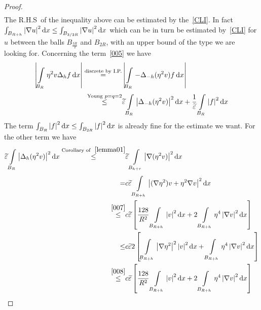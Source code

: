 \begin{proof}
\begin{gather}
	\end{gather}
	The R.H.S\ of the inequality above can be estimated by the~\eqref{CLI}. In fact \( \int_{B_{R+h}}^{} \abs{\nabla u}^{2} \dd{x} \leq \int_{B_{\frac{3}{2}R}}^{} \abs{\nabla u}^{2} \dd{x} \) which can be in turn be estimated by~\eqref{CLI} for \( u \) between the balls \( B_{\frac{3R}{2}} \) and \( B_{2R} \), with an upper bound of the type we are looking for. Concerning the term~\eqref{005} we have
	\begin{align}
		\label{005} \abs{\int\limits_{B_{R}}^{} \eta ^{2} v \Delta _{h} f \dd{x}} \overset{\text{discrete by I.P.}}{=} & \abs{\int\limits_{B_{R}}^{} - \Delta _{-h} (\eta ^{2} v) f  \dd{x}}  \\
		\overset{\text{Young }p=q=2}{\leq}                                                                             & \widetilde{\varepsilon} \int\limits_{B_{R}}^{} \abs{\Delta _{-h}(\eta ^{2}v)}^{2} \dd{x} + \frac{1}{ \widetilde{\varepsilon}} \int\limits_{B_{R}}^{} \abs{f}^{2} \dd{x} \notag
	\end{align}
	The term \( \int_{B_{R}}^{} \left\lvert f\right\rvert^{2} \mathop{}\!\mathrm{d}x \leq \int_{B_{2R}}^{} \left\lvert f\right\rvert^{2} \mathop{}\!\mathrm{d}x \) is already fine for the estimate we want. For the other term we have
	\begin{align}
		\widetilde{\varepsilon }\int\limits_{B_{R}}^{} \abs{\Delta _{h}(\eta ^{2}v)}^{2} \dd{x} \overset{\text{Corollary of }~\ref{lemma01}}{\leq} & \widetilde{\varepsilon } \int\limits_{B_{h+r}}^{} \abs{\nabla (\eta ^{2}v) }^{2} \dd{x}  \\
		=                                                                                                                                          & c \widetilde{\varepsilon }\int\limits_{B_{R+h}}^{} \abs{(\nabla \eta ^{2})v+\eta ^{2} \nabla v }^{2} \dd{x}  \\
		\overset{\eqref{007}}{\leq}                                                                                                                & c \widetilde{\varepsilon} \left[ \frac{128}{R^{2}} \int\limits_{B_{R+h}}^{} \abs{v}^{2} \dd{x} + 2 \int\limits_{B_{R+h}}^{} \eta ^{4} \abs{\nabla v}^{2} \dd{x} \right]  \\
		\leq                                                                                                                                       & c \widetilde{\varepsilon } 2 \left[ \int\limits_{B_{R+h}}^{} \abs{\nabla \eta ^{2}}^{2} \abs{v}^{2} \dd{x} + \int\limits_{B_{R+h}}^{} \eta ^{4} \abs{\nabla v}^{2} \dd{x} \right]  \\
		\overset{\eqref{008}}{\leq}                                                                                                                & c \widetilde{\varepsilon} \left[ \frac{128}{R^{2}} \int\limits_{B_{R+h}}^{} \abs{v}^{2} \dd{x} + 2 \int\limits_{B_{R+h}}^{} \eta ^{4} \abs{\nabla v}^{2} \dd{x} \right]  \\

\end{align}
\end{proof}
